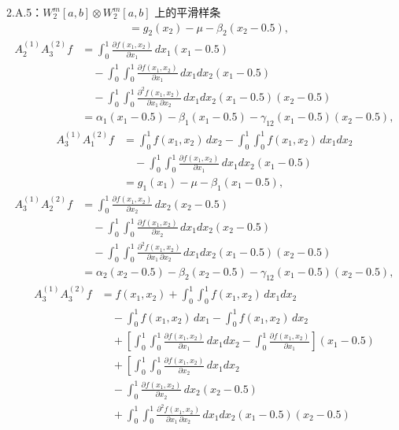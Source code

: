 \begin{bookexample}{2.A.5：$W_2^m[a,b]\otimes W_2^m[a,b]$ 上的平滑样条}
\[\begin{aligned}
 &=g_2(x_2)-\mu-\beta_2(x_2-0.5),
\end{aligned}
\]
\[
\begin{aligned}
A_2^{(1)}A_3^{(2)}f
 &=\int_0^1\frac{\partial f(x_1,x_2)}{\partial x_1}\,dx_1(x_1-0.5)\\
 &\quad-\int_0^1\int_0^1
    \frac{\partial f(x_1,x_2)}{\partial x_1}\,dx_1dx_2(x_1-0.5)\\
 &\quad-\int_0^1\int_0^1
    \frac{\partial^2f(x_1,x_2)}{\partial x_1\,\partial x_2}
    \,dx_1dx_2(x_1-0.5)(x_2-0.5)\\
 &=\alpha_1(x_1-0.5)-\beta_1(x_1-0.5)
   -\gamma_{12}(x_1-0.5)(x_2-0.5),
\end{aligned}
\]
\[
\begin{aligned}
A_3^{(1)}A_1^{(2)}f
 &=\int_0^1f(x_1,x_2)\,dx_2
  -\int_0^1\int_0^1f(x_1,x_2)\,dx_1dx_2\\
 &\quad-\int_0^1\int_0^1
    \frac{\partial f(x_1,x_2)}{\partial x_1}\,dx_1dx_2(x_1-0.5)\\
 &=g_1(x_1)-\mu-\beta_1(x_1-0.5),
\end{aligned}
\]
\[
\begin{aligned}
A_3^{(1)}A_2^{(2)}f
 &=\int_0^1\frac{\partial f(x_1,x_2)}{\partial x_2}\,dx_2(x_2-0.5)\\
 &\quad-\int_0^1\int_0^1
    \frac{\partial f(x_1,x_2)}{\partial x_2}\,dx_1dx_2(x_2-0.5)\\
 &\quad-\int_0^1\int_0^1
    \frac{\partial^2f(x_1,x_2)}{\partial x_1\,\partial x_2}
    \,dx_1dx_2(x_1-0.5)(x_2-0.5)\\
 &=\alpha_2(x_2-0.5)-\beta_2(x_2-0.5)
   -\gamma_{12}(x_1-0.5)(x_2-0.5),
\end{aligned}
\]
\[
\begin{aligned}
A_3^{(1)}A_3^{(2)}f
 &=f(x_1,x_2)+\int_0^1\int_0^1f(x_1,x_2)\,dx_1dx_2\\
 &\quad-\int_0^1f(x_1,x_2)\,dx_1-\int_0^1f(x_1,x_2)\,dx_2\\
 &\quad+\left[\int_0^1\int_0^1
    \frac{\partial f(x_1,x_2)}{\partial x_1}\,dx_1dx_2
    -\int_0^1\frac{\partial f(x_1,x_2)}{\partial x_1}\right](x_1-0.5)\\
 &\quad+\left[\int_0^1\int_0^1
    \frac{\partial f(x_1,x_2)}{\partial x_2}\,dx_1dx_2\right.\\
 &\quad-\int_0^1\frac{\partial f(x_1,x_2)}{\partial x_2}
    \,dx_2(x_2-0.5)\\
 &\quad+\int_0^1\int_0^1
    \frac{\partial^2f(x_1,x_2)}{\partial x_1\,\partial x_2}
    \,dx_1dx_2(x_1-0.5)(x_2-0.5)\\

\end{aligned}\]
\end{bookexample}
